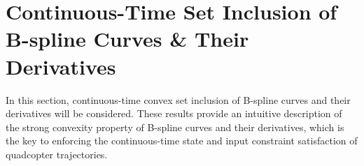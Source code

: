 \documentclass[journal,10pt]{IEEEtran}
\newtheorem{definition}{\bfseries Definition}%
\newcommand{\vect}[1]{\boldsymbol{\mathbf{#1}}}
\newcommand{\mat}[1]{\begin{bmatrix} #1 \end{bmatrix}}
\begin{document}
\section{Continuous-Time Set Inclusion of B-spline Curves \& Their Derivatives}\label{sec:Constraint}
In this section, continuous-time convex set inclusion of B-spline curves and their derivatives will be considered. These results provide an intuitive description of the strong convexity property of B-spline curves and their derivatives, which is the key to enforcing the continuous-time state and input constraint satisfaction of quadcopter trajectories.

\end{document}
